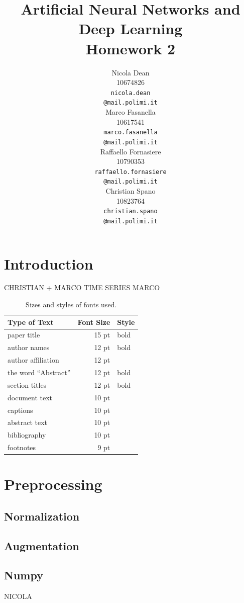 \documentclass[11pt]{article}
\title{Artificial Neural Networks and Deep Learning \\
Homework 2}
\author{
  Nicola Dean \\
  10674826 \\
  {\tt nicola.dean \\
  \tt @mail.polimi.it} \\\And
  Marco Fasanella \\
  10617541 \\
  {\tt marco.fasanella \\
  \tt @mail.polimi.it} \\\And
  Raffaello Fornasiere \\
    10790353 \\
    {\tt raffaello.fornasiere \\
    \tt @mail.polimi.it} \\\And
  Christian Spano \\
  10823764 \\
  {\tt christian.spano \\
  \tt @mail.polimi.it} \\}
\date{}
\begin{document}
\maketitle


\section{Introduction}


CHRISTIAN + MARCO
TIME SERIES MARCO
\begin{table}[h]
\begin{center}
\begin{tabular}{|l|rl|}
\hline \bf Type of Text & \bf Font Size & \bf Style \\ \hline
paper title & 15 pt & bold \\
author names & 12 pt & bold \\
author affiliation & 12 pt & \\
the word ``Abstract'' & 12 pt & bold \\
section titles & 12 pt & bold \\
document text & 10 pt  &\\
captions & 10 pt & \\
abstract text & 10 pt & \\
bibliography & 10 pt & \\
footnotes & 9 pt & \\
\hline
\end{tabular}
\end{center}
\caption{\label{fontsizes} Sizes and styles of fonts used.}
\end{table}




\section{Preprocessing}
\subsection{Normalization}

\subsection{Augmentation}
\subsection{Numpy}
NICOLA
\end{document}
